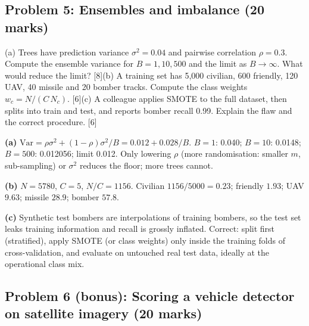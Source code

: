 \documentclass[11pt]{article}
\begin{document}
\subsection{Problem 5: Ensembles and imbalance \normalfont\small\color{GreyN}(20 marks)}

\begin{prob}(a) Trees have prediction variance $\sigma^2=0.04$ and pairwise correlation $\rho=0.3$. Compute the ensemble variance for $B=1,10,500$ and the limit as $B\to\infty$. What would reduce the limit? [8]\newline (b) A training set has 5,000 civilian, 600 friendly, 120 UAV, 40 missile and 20 bomber tracks. Compute the class weights $w_c=N/(C\,N_c)$. [6]\newline (c) A colleague applies SMOTE to the full dataset, then splits into train and test, and reports bomber recall 0.99. Explain the flaw and the correct procedure. [6]\end{prob}

\begin{soln}\textbf{(a)} $\text{Var}=\rho\sigma^2+(1-\rho)\sigma^2/B=0.012+0.028/B$. $B=1$: 0.040; $B=10$: 0.0148; $B=500$: 0.012056; limit 0.012. Only lowering $\rho$ (more randomisation: smaller $m$, sub-sampling) or $\sigma^2$ reduces the floor; more trees cannot.

\textbf{(b)} $N=5780$, $C=5$, $N/C=1156$. Civilian $1156/5000=0.23$; friendly $1.93$; UAV $9.63$; missile $28.9$; bomber $\mathbf{57.8}$.

\textbf{(c)} Synthetic test bombers are interpolations of training bombers, so the test set leaks training information and recall is grossly inflated. Correct: split first (stratified), apply SMOTE (or class weights) only inside the training folds of cross-validation, and evaluate on untouched real test data, ideally at the operational class mix.\end{soln}

\subsection{Problem 6 (bonus): Scoring a vehicle detector on satellite imagery \normalfont\small\color{GreyN}(20 marks)}
\end{document}
